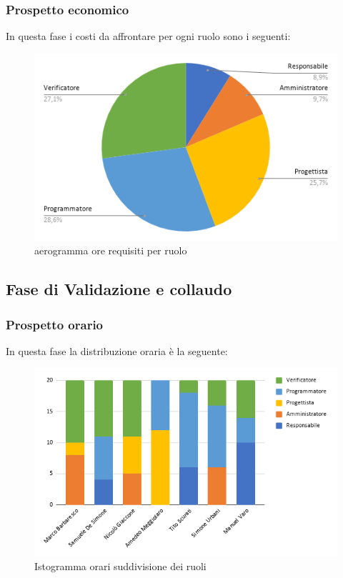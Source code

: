\subsubsection{Prospetto economico}
In questa fase i costi da affrontare per ogni ruolo sono i seguenti:
\begin{figure}[!h]
    \caption{aerogramma ore requisiti per ruolo}
    \vspace{5px}
    \includegraphics[scale=0.5]{../../../Images/Diagrammi/Diagramma a torta/ore codifica.png}
    \centering
\end{figure}  



\subsection{Fase di Validazione e collaudo}
    \subsubsection{Prospetto orario}
    In questa fase la distribuzione oraria è la seguente:
    \begin{figure}[!h]
        \caption{Istogramma orari suddivisione dei ruoli}
        \vspace{5px}
        \includegraphics[scale=0.6]{../../../Images/Diagrammi/Istogrammi/ore validificazione.png}
        \centering
    \end{figure}
